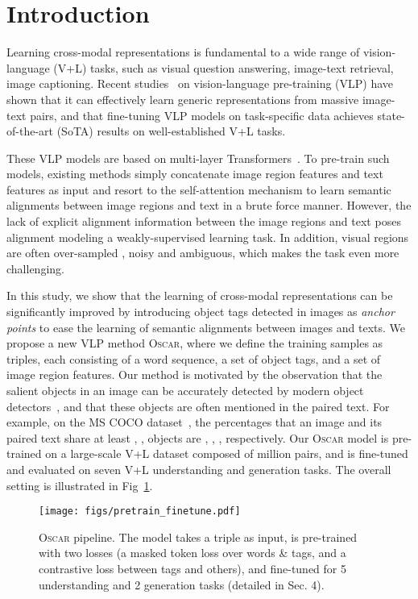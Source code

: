 \documentclass[runningheads]{llncs}
\newcommand{\short}{\textsc{Oscar}}
\begin{document}
\section{Introduction}
Learning cross-modal representations is fundamental to a wide range of vision-language (V+L) tasks, such as visual question answering, image-text retrieval, image captioning. Recent studies~\cite{lu2019vilbert,tan2019lxmert,chen2019uniter,su2019vl,li2019visualbert,li2019unicoder,zhou2019unified} on vision-language pre-training (VLP) have shown that it can effectively learn generic representations from massive image-text pairs, and that fine-tuning VLP models on task-specific data achieves state-of-the-art (SoTA) results on well-established V+L tasks.

These VLP models are based on multi-layer Transformers~\cite{vaswani2017attention}.
To pre-train such models, existing methods simply concatenate image region features and text features as input and resort to the self-attention mechanism to learn semantic alignments between image regions and text in a brute force manner.
However, the lack of explicit alignment information between the image regions and text poses alignment modeling a weakly-supervised learning task. In addition, visual regions are often over-sampled \cite{anderson2018bottom}, noisy and ambiguous, which makes the task even more challenging. 


In this study, we show that the learning of cross-modal representations can be significantly improved by introducing object tags detected in images as \emph{anchor points} to ease the learning of semantic alignments between images and texts. 
We propose a new VLP method \short, where we define the training samples as triples, each consisting of a word sequence, a set of object tags, and a set of image region features. Our method is motivated by the observation that the salient objects in an image can be accurately detected by modern object detectors~\cite{ren2015faster}, and that these objects are often mentioned in the paired text.
For example, on the MS COCO dataset~\cite{lin2014microsoft}, the percentages that an image and its paired text share at least , ,  objects are , , , respectively. Our \short{} model is pre-trained on a large-scale V+L dataset composed of  million pairs, and is fine-tuned and evaluated on seven V+L understanding and generation tasks. The overall setting is illustrated in Fig~\ref{fig:pretrain_finetune}.


\begin{figure}[t!]
\centering
{\texttt{[image: figs/pretrain\_finetune.pdf]}}
\vspace{-3mm}
\caption{\small \short{} pipeline. The model takes a triple as input, is pre-trained with two losses (a masked token loss over words \& tags, and a contrastive loss between tags and others), and fine-tuned for 5 understanding and 2 generation tasks (detailed in Sec. 4). }
\label{fig:pretrain_finetune}
\vspace{-5mm}
\end{figure}
\end{document}
